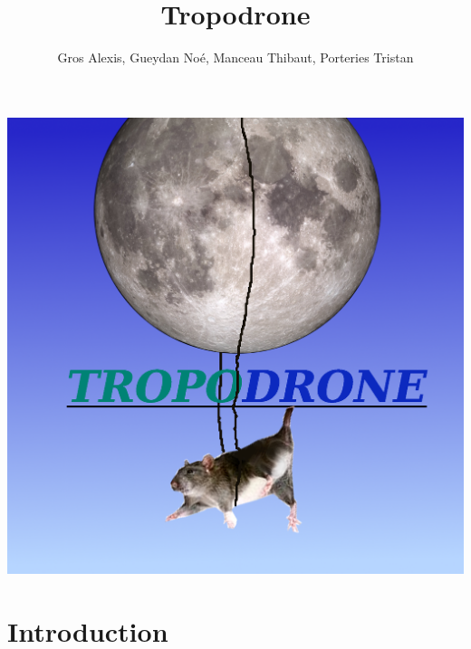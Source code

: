 \documentclass[a4paper,11pt]{article}
\title{Tropodrone}
\author{Gros Alexis, Gueydan Noé, Manceau Thibaut, Porteries Tristan}
\begin{document}
\begin{Huge}
\maketitle

\begin{center}
 \includegraphics[width=15cm]{../Images/logo.png}
\end{center}


\end{Huge}

\clearpage

\tableofcontents

\clearpage

\section{Introduction}
\end{document}
